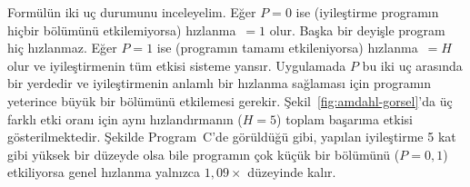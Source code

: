 Formülün iki uç durumunu inceleyelim. Eğer $P = 0$ ise (iyileştirme programın hiçbir bölümünü etkilemiyorsa) hızlanma~$= 1$ olur. Başka bir deyişle program hiç hızlanmaz. Eğer $P = 1$ ise (programın tamamı etkileniyorsa) hızlanma~$= H$ olur ve iyileştirmenin tüm etkisi sisteme yansır. Uygulamada $P$ bu iki uç arasında bir yerdedir ve iyileştirmenin anlamlı bir hızlanma sağlaması için programın yeterince büyük bir bölümünü etkilemesi gerekir. Şekil~\ref{fig:amdahl-gorsel}'da üç farklı etki oranı için aynı hızlandırmanın ($H=5$) toplam başarıma etkisi gösterilmektedir. Şekilde Program~C'de görüldüğü gibi, yapılan iyileştirme 5 kat gibi yüksek bir düzeyde olsa bile programın çok küçük bir bölümünü ($P=0{,}1$) etkiliyorsa genel hızlanma yalnızca $1{,}09\times$ düzeyinde kalır.

\begin{figure}[H]
\centering
{}
\end{figure}
